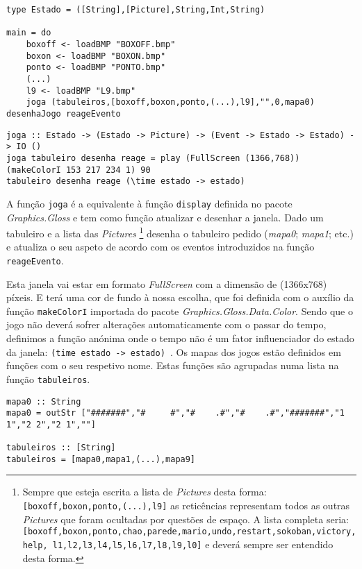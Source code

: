 \documentclass[a4paper,12pt]{report}
\begin{document}
\begin{lstlisting}[caption={\small\sl Ponto de entrada {\footnotesize\tt main} que carrega os diversos bitmaps e executa a função {\footnotesize\tt joga} e o type Estado.}]
type Estado = ([String],[Picture],String,Int,String)

main = do
	boxoff <- loadBMP "BOXOFF.bmp"
	boxon <- loadBMP "BOXON.bmp"
	ponto <- loadBMP "PONTO.bmp"
	(...)
	l9 <- loadBMP "L9.bmp"
	joga (tabuleiros,[boxoff,boxon,ponto,(...),l9],"",0,mapa0) desenhaJogo reageEvento
\end{lstlisting}

\begin{lstlisting}[caption={\small\sl Função {\footnotesize\tt joga}}]
joga :: Estado -> (Estado -> Picture) -> (Event -> Estado -> Estado) -> IO ()
joga tabuleiro desenha reage = play (FullScreen (1366,768))
(makeColorI 153 217 234 1) 90
tabuleiro desenha reage (\time estado -> estado)
\end{lstlisting}

A função {\footnotesize\tt joga} é a equivalente à função {\footnotesize\tt display} definida no pacote {\it Graphics.Gloss} e tem como função atualizar e desenhar a janela. Dado um tabuleiro e a lista das {\sl Pictures} \footnote{\scriptsize Sempre que esteja escrita a lista de {\sl Pictures} desta forma: {\scriptsize\tt [boxoff,boxon,ponto,(...),l9]} as reticências representam todos as outras {\sl Pictures} que foram ocultadas por questões de espaço. A lista completa seria: {\scriptsize\tt [boxoff,boxon,ponto,chao,parede,mario,undo,restart,sokoban,victory,help, l1,l2,l3,l4,l5,l6,l7,l8,l9,l0]} e deverá sempre ser entendido desta forma.} desenha o tabuleiro pedido ({\sl mapa0}; {\sl mapa1}; etc.) e atualiza o seu aspeto de acordo com os eventos introduzidos na função {\footnotesize\tt reageEvento}.

Esta janela vai estar em formato {\sl FullScreen} com a dimensão de (1366x768) píxeis. E terá uma cor de fundo à nossa escolha, que foi definida com o auxílio da função {\footnotesize\tt makeColorI} importada do pacote {\it Graphics.Gloss.Data.Color}. Sendo que o jogo não deverá sofrer alterações automaticamente com o passar do tempo, definimos a função anónima onde o tempo não é um fator influenciador do estado da janela: {\footnotesize\tt (time estado -> estado) }. Os mapas dos jogos estão definidos em funções com o seu respetivo nome. Estas funções são agrupadas numa lista na função {\footnotesize\tt tabuleiros}.
\\
\begin{lstlisting}[caption={\small\sl Função que define o {\footnotesize\tt mapa0} e função {\footnotesize\tt tabuleiros} que agrupa os mapas numa lista.}]
mapa0 :: String
mapa0 = outStr ["#######","#     #","#    .#","#    .#","#######","1 1","2 2","2 1",""]

tabuleiros :: [String]
tabuleiros = [mapa0,mapa1,(...),mapa9]
\end{lstlisting}
\end{document}
